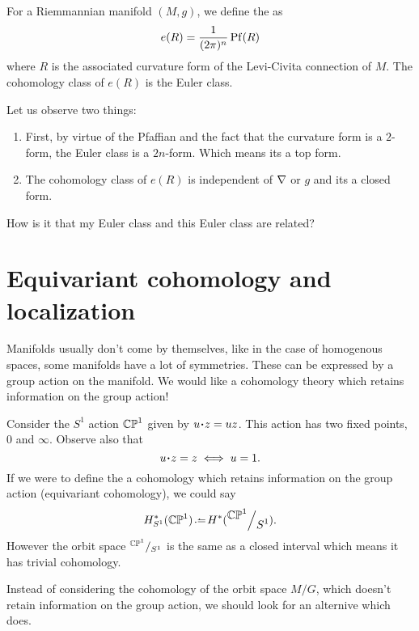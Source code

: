 \documentclass[12pt]{memoir}
\begin{document}
\begin{Def}
    For a Riemmannian manifold $(M,g)$, we define the  as 
    $$e(R)=\frac{1}{(2\pi)^n}\operatorname{Pf}(R)$$
    where $R$ is the associated curvature form of the Levi-Civita connection of $M$. The cohomology class of $e(R)$ is the Euler class.
\end{Def}

\begin{Rmk}
    Let us observe two things:
    \begin{enumerate}
        \item First, by virtue of the Pfaffian and the fact that the curvature form is a $2$-form, the Euler class is a $2n$-form. Which means its a top form.
        \item The cohomology class of $e(R)$ is independent of ${\mathbf{\nabla}}$ or $g$ and its a closed form.
    \end{enumerate}
\end{Rmk}

\begin{Qn}
How is it that my Euler class and this Euler class are related?
\end{Qn}

\section{Equivariant cohomology and localization}

Manifolds usually don't come by themselves, like in the case of homogenous spaces, some manifolds have a lot of symmetries. These can be expressed by a group action on the manifold. We would like a cohomology theory which retains information on the group action!

\begin{Ex}
    Consider the $S^1$ action $\mathbb{CP}^1$ given by $u\. z=uz$. This action has two fixed points, $0$ and $\infty$. Observe also that 
    $$u\.z=z\iff u=1.$$
    If we were to define the a cohomology which retains information on the group action (equivariant cohomology), we could say 
    $$H_{S^1}^\ast(\bCP^1)\defeq H^\ast(\quot{\bCP^1}{S^1}).$$
    However the orbit space $\quot{\bCP^1}{S^1}$ is the same as a closed interval which means it has trivial cohomology.
\end{Ex}

Instead of considering the cohomology of the orbit space $M/G$, which doesn't retain information on the group action, we should look for an alternive which does.
\end{document}
